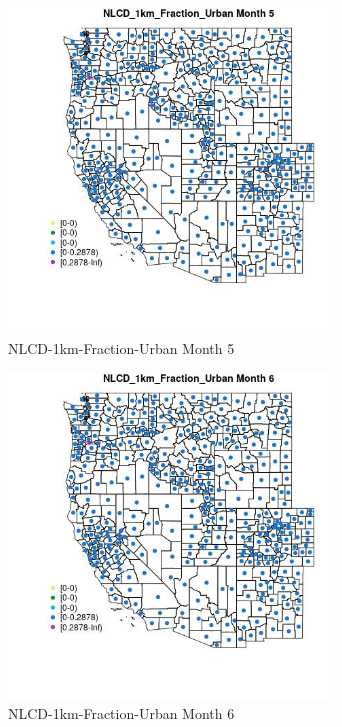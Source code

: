 \begin{figure} 
\centering  
\includegraphics[width=0.77\textwidth]{Code_Outputs/df_report_ML_predictors_CountyCentroid_Locations_Dates_2008-01-01to2018-12-31_MapObsMo5NLCD_1km_Fraction_Urban.jpg} 
\caption{\label{fig:df_report_ML_predictors_CountyCentroid_Locations_Dates_2008-01-01to2018-12-31MapObsMo5NLCD_1km_Fraction_Urban}NLCD-1km-Fraction-Urban Month 5} 
\end{figure} 
 

\begin{figure} 
\centering  
\includegraphics[width=0.77\textwidth]{Code_Outputs/df_report_ML_predictors_CountyCentroid_Locations_Dates_2008-01-01to2018-12-31_MapObsMo6NLCD_1km_Fraction_Urban.jpg} 
\caption{\label{fig:df_report_ML_predictors_CountyCentroid_Locations_Dates_2008-01-01to2018-12-31MapObsMo6NLCD_1km_Fraction_Urban}NLCD-1km-Fraction-Urban Month 6} 
\end{figure} 
 

